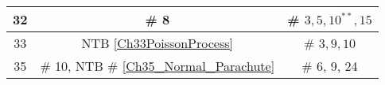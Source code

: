 \documentclass[12pt]{article}
\begin{document}
\begin{center}
\begin{tabular}{|c|c||c|}
32 & \# 8 & \# $3, 5, 10^{**}, 15$\\
\hline	

33  &  NTB \ref{Ch33PoissonProcess}   & \# $3, 9, 10$\\
\hline	

35 & \# 10, NTB \# \ref{Ch35_Normal_Parachute}    & \# 6, 9, 24\\   %
\hline	
	

%
%


\end{tabular}
\end{center}



\vspace{.1cm}





\end{document}
